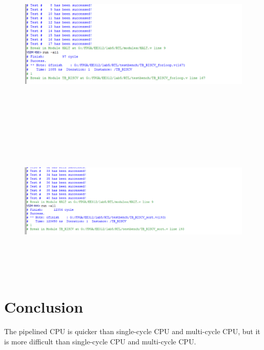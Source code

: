 \documentclass[12pt,a4paper]{article}
\begin{document}
\begin{figure}[H]
  \centering
  \includegraphics[height=3in]{forloop.png}
  \end{figure}

  \begin{figure}[H]
    \centering
    \includegraphics[height=3in]{sort.png}
    \end{figure}


\section{Conclusion}

The pipelined CPU is quicker than single-cycle CPU and multi-cycle CPU, but it is more difficult than single-cycle CPU and multi-cycle CPU.
\end{document}
